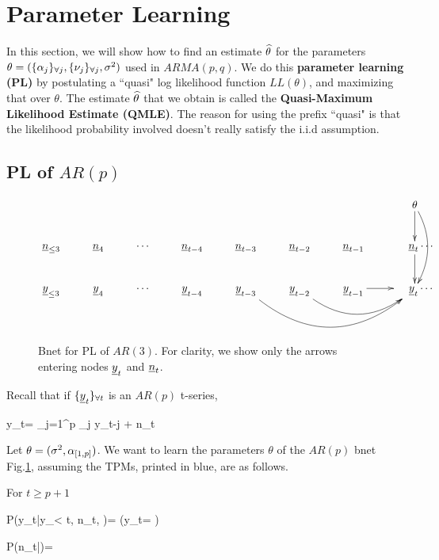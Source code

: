 \section{Parameter Learning}
\label{sec-time-arma-param-learn}

In this section,
we will show
how to find an estimate
$\widehat{\theta}$
for the parameters
$\theta=(\{\alpha_j\}_{\forall j}, \{\nu_j\}_{\forall j},
\sigma^2)$
used in
$ARMA(p,q)$.
We do this {\bf parameter learning (PL)} by
postulating a ``quasi" log
 likelihood function
$ LL(\theta)$,
and
maximizing
that over $\theta$.
The estimate $\widehat{\theta}$
that we obtain is called
the
{\bf Quasi-Maximum Likelihood Estimate
 (QMLE)}.
The reason for
using the prefix ``quasi"
is that the likelihood
probability
involved doesn't really satisfy
the i.i.d assumption.

\subsection{PL of $AR(p)$}



\begin{figure}[h!]
$$
\xymatrix{
&&&&&&&\theta\ar[d]\ar@/^1pc/[dd]
\\
\rvn_{\leq 3}
&\rvn_{4}
&\cdots
&\rvn_{t-4}
&\rvn_{t-3}
&\rvn_{t-2}
&\rvn_{t-1}
&\;\;\;\;\rvn_{t}\ar[d]
\cdots
\\
\rvy_{\leq 3}
&\rvy_{4}
&\cdots
&\rvy_{t-4}
&\rvy_{t-3}\ar@/_3pc/[rrr]
&\rvy_{t-2}\ar@/_2pc/[rr]
&\rvy_{t-1}\ar[r]
&\;\;\;\;\rvy_{t}
\cdots
\\
\;
}
$$
\caption{Bnet for
PL of
$AR(3)$.
For clarity,
we show only the
arrows entering nodes ${\underline{y}}_t$
and ${\underline{n}}_t$.}
\label{fig-qmle-ar-3}
\end{figure}

Recall that if ${\{{\underline{y}}_t\}_{\forall t}}$
is an  $AR(p)$
t-series,

\beq
y_t=
\sum_{j=1}^p
\alp_j y_{t-j} + n_t
\label{eq-qmle-ar-p-def}
\eeq

Let $\theta=(\sigma^2, \alpha_{[1,p]})$.
We want to learn the parameters
$\theta$ of the $AR(p)$ bnet
Fig.\ref{fig-qmle-ar-3},
assuming the TPMs, printed in blue,
are as follows.


For $t\geq p+1$

\beq\color{blue}
P(y_t|y_{< t}, n_t, \theta)=
\indi\left(y_t=
\right)
\eeq


\beq\color{blue}
P(n_t|\theta)=
{\s\sqrt{2\pi}}
\exp{}
\eeq

